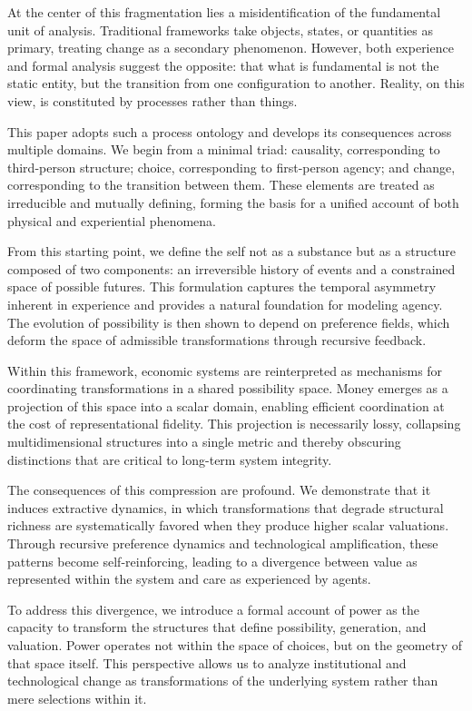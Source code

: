\documentclass[11pt,a4paper]{article}
\theoremstyle{definition}
\theoremstyle{remark}
\begin{document}
At the center of this fragmentation lies a misidentification of the fundamental unit of analysis. Traditional frameworks take objects, states, or quantities as primary, treating change as a secondary phenomenon. However, both experience and formal analysis suggest the opposite: that what is fundamental is not the static entity, but the transition from one configuration to another. Reality, on this view, is constituted by processes rather than things.

This paper adopts such a process ontology and develops its consequences across multiple domains. We begin from a minimal triad: causality, corresponding to third-person structure; choice, corresponding to first-person agency; and change, corresponding to the transition between them. These elements are treated as irreducible and mutually defining, forming the basis for a unified account of both physical and experiential phenomena.

From this starting point, we define the self not as a substance but as a structure composed of two components: an irreversible history of events and a constrained space of possible futures. This formulation captures the temporal asymmetry inherent in experience and provides a natural foundation for modeling agency. The evolution of possibility is then shown to depend on preference fields, which deform the space of admissible transformations through recursive feedback.

Within this framework, economic systems are reinterpreted as mechanisms for coordinating transformations in a shared possibility space. Money emerges as a projection of this space into a scalar domain, enabling efficient coordination at the cost of representational fidelity. This projection is necessarily lossy, collapsing multidimensional structures into a single metric and thereby obscuring distinctions that are critical to long-term system integrity.

The consequences of this compression are profound. We demonstrate that it induces extractive dynamics, in which transformations that degrade structural richness are systematically favored when they produce higher scalar valuations. Through recursive preference dynamics and technological amplification, these patterns become self-reinforcing, leading to a divergence between value as represented within the system and care as experienced by agents.

To address this divergence, we introduce a formal account of power as the capacity to transform the structures that define possibility, generation, and valuation. Power operates not within the space of choices, but on the geometry of that space itself. This perspective allows us to analyze institutional and technological change as transformations of the underlying system rather than mere selections within it.
\end{document}

